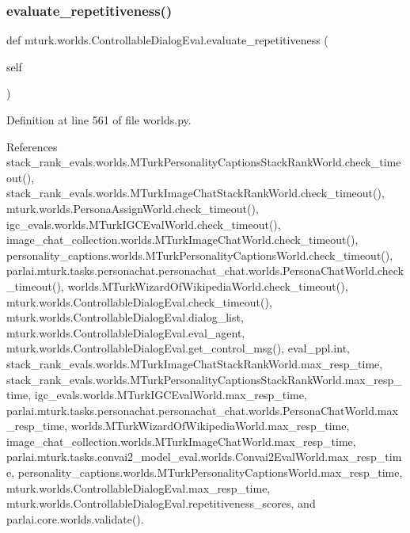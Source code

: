 \subsubsection{\texorpdfstring{evaluate\+\_\+repetitiveness()}{evaluate\_repetitiveness()}}
{\footnotesize\ttfamily def mturk.\+worlds.\+Controllable\+Dialog\+Eval.\+evaluate\+\_\+repetitiveness (\begin{DoxyParamCaption}\item[{}]{self }\end{DoxyParamCaption})}



Definition at line 561 of file worlds.\+py.



References stack\+\_\+rank\+\_\+evals.\+worlds.\+M\+Turk\+Personality\+Captions\+Stack\+Rank\+World.\+check\+\_\+timeout(), stack\+\_\+rank\+\_\+evals.\+worlds.\+M\+Turk\+Image\+Chat\+Stack\+Rank\+World.\+check\+\_\+timeout(), mturk.\+worlds.\+Persona\+Assign\+World.\+check\+\_\+timeout(), igc\+\_\+evals.\+worlds.\+M\+Turk\+I\+G\+C\+Eval\+World.\+check\+\_\+timeout(), image\+\_\+chat\+\_\+collection.\+worlds.\+M\+Turk\+Image\+Chat\+World.\+check\+\_\+timeout(), personality\+\_\+captions.\+worlds.\+M\+Turk\+Personality\+Captions\+World.\+check\+\_\+timeout(), parlai.\+mturk.\+tasks.\+personachat.\+personachat\+\_\+chat.\+worlds.\+Persona\+Chat\+World.\+check\+\_\+timeout(), worlds.\+M\+Turk\+Wizard\+Of\+Wikipedia\+World.\+check\+\_\+timeout(), mturk.\+worlds.\+Controllable\+Dialog\+Eval.\+check\+\_\+timeout(), mturk.\+worlds.\+Controllable\+Dialog\+Eval.\+dialog\+\_\+list, mturk.\+worlds.\+Controllable\+Dialog\+Eval.\+eval\+\_\+agent, mturk.\+worlds.\+Controllable\+Dialog\+Eval.\+get\+\_\+control\+\_\+msg(), eval\+\_\+ppl.\+int, stack\+\_\+rank\+\_\+evals.\+worlds.\+M\+Turk\+Image\+Chat\+Stack\+Rank\+World.\+max\+\_\+resp\+\_\+time, stack\+\_\+rank\+\_\+evals.\+worlds.\+M\+Turk\+Personality\+Captions\+Stack\+Rank\+World.\+max\+\_\+resp\+\_\+time, igc\+\_\+evals.\+worlds.\+M\+Turk\+I\+G\+C\+Eval\+World.\+max\+\_\+resp\+\_\+time, parlai.\+mturk.\+tasks.\+personachat.\+personachat\+\_\+chat.\+worlds.\+Persona\+Chat\+World.\+max\+\_\+resp\+\_\+time, worlds.\+M\+Turk\+Wizard\+Of\+Wikipedia\+World.\+max\+\_\+resp\+\_\+time, image\+\_\+chat\+\_\+collection.\+worlds.\+M\+Turk\+Image\+Chat\+World.\+max\+\_\+resp\+\_\+time, parlai.\+mturk.\+tasks.\+convai2\+\_\+model\+\_\+eval.\+worlds.\+Convai2\+Eval\+World.\+max\+\_\+resp\+\_\+time, personality\+\_\+captions.\+worlds.\+M\+Turk\+Personality\+Captions\+World.\+max\+\_\+resp\+\_\+time, mturk.\+worlds.\+Controllable\+Dialog\+Eval.\+max\+\_\+resp\+\_\+time, mturk.\+worlds.\+Controllable\+Dialog\+Eval.\+repetitiveness\+\_\+scores, and parlai.\+core.\+worlds.\+validate().



